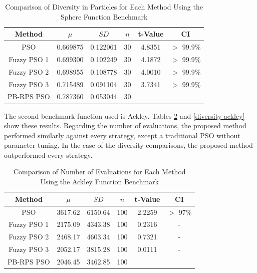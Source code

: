 \begin{table}[!t]
  \renewcommand{\arraystretch}{1.3}
  \caption{Comparison of Diversity in Particles for Each Method Using the Sphere Function Benchmark}
  \label{diversity-sphere}
  \centering
  \begin{tabular}{|c|c|c|c|c|c|}
    \hline
    Method & $\mu$ & $SD$ & $n$ & t-Value & CI \\
    \hline
    PSO 		& 0.669875 & 0.122061 & 30 & 4.8351 & $>$ 99.9\% \\
    \hline
    Fuzzy PSO 1 & 0.699300 & 0.102249 & 30 & 4.1872 & $>$ 99.9\% \\
    \hline
    Fuzzy PSO 2 & 0.698955 & 0.108778 & 30 & 4.0010 & $>$ 99.9\% \\
    \hline
    Fuzzy PSO 3 & 0.715489 & 0.091104 & 30 & 3.7341 & $>$ 99.9\% \\
    \hline
    PB-RPS PSO  & 0.787360 & 0.053044 & 30 &  &  \\
    \hline
  \end{tabular}
\end{table}

The second benchmark function used is Ackley. Tables \ref{evaluations-ackley} and \ref{diversity-ackley} show these results. Regarding the number of evaluations, the proposed method performed similarly against every strategy, except a traditional PSO without parameter tuning. In the case of the diversity comparisons, the proposed method outperformed every strategy.

\begin{table}[!t]
  \renewcommand{\arraystretch}{1.3}
  \caption{Comparison of Number of Evaluations for Each Method Using the Ackley Function Benchmark}
  \label{evaluations-ackley}
  \centering
  \begin{tabular}{|c|c|c|c|c|c|}
    \hline
    Method & $\mu$ & $SD$ & $n$ & t-Value & CI \\
    \hline
    PSO 		& 3617.62 & 6150.64 & 100 & 2.2259 & $>$ 97\% \\
    \hline
    Fuzzy PSO 1 & 2175.09 & 4343.38 & 100 & 0.2316 & - \\
    \hline
    Fuzzy PSO 2 & 2468.17 & 4603.34 & 100 & 0.7321 & - \\
    \hline
    Fuzzy PSO 3 & 2052.17 & 3815.28 & 100 & 0.0111 & - \\
    \hline
    PB-RPS PSO  & 2046.45 & 3462.85 & 100 &  &  \\
    \hline
  \end{tabular}
\end{table}

